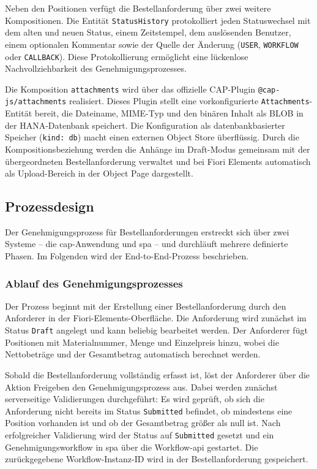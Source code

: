 Neben den Positionen verfügt die Bestellanforderung über zwei weitere Kompositionen. Die Entität \texttt{StatusHistory} protokolliert jeden Statuswechsel mit dem alten und neuen Status, einem Zeitstempel, dem auslösenden Benutzer, einem optionalen Kommentar sowie der Quelle der Änderung (\texttt{USER}, \texttt{WORKFLOW} oder \texttt{CALLBACK}). Diese Protokollierung ermöglicht eine lückenlose Nachvollziehbarkeit des Genehmigungsprozesses.

Die Komposition \texttt{attachments} wird über das offizielle CAP-Plugin \texttt{@cap-js/attachments} realisiert. Dieses Plugin stellt eine vorkonfigurierte \texttt{Attachments}-Entität bereit, die Dateiname, MIME-Typ und den binären Inhalt als BLOB in der HANA-Datenbank speichert. Die Konfiguration als datenbankbasierter Speicher (\texttt{kind: db}) macht einen externen Object Store überflüssig. Durch die Kompositionsbeziehung werden die Anhänge im Draft-Modus gemeinsam mit der übergeordneten Bestellanforderung verwaltet und bei Fiori Elements automatisch als Upload-Bereich in der Object Page dargestellt.

\subsection{Prozessdesign}
\label{subsec:prozessdesign}

Der Genehmigungsprozess für Bestellanforderungen erstreckt sich über zwei Systeme -- die \gls{cap}-Anwendung und \gls{spa} -- und durchläuft mehrere definierte Phasen. Im Folgenden wird der End-to-End-Prozess beschrieben.

\subsubsection{Ablauf des Genehmigungsprozesses}

Der Prozess beginnt mit der Erstellung einer Bestellanforderung durch den Anforderer in der Fiori-Elements-Oberfläche. Die Anforderung wird zunächst im Status \texttt{Draft} angelegt und kann beliebig bearbeitet werden. Der Anforderer fügt Positionen mit Materialnummer, Menge und Einzelpreis hinzu, wobei die Nettobeträge und der Gesamtbetrag automatisch berechnet werden.

Sobald die Bestellanforderung vollständig erfasst ist, löst der Anforderer über die Aktion \glqq Freigeben\grqq{} den Genehmigungsprozess aus. Dabei werden zunächst serverseitige Validierungen durchgeführt: Es wird geprüft, ob sich die Anforderung nicht bereits im Status \texttt{Submitted} befindet, ob mindestens eine Position vorhanden ist und ob der Gesamtbetrag größer als null ist. Nach erfolgreicher Validierung wird der Status auf \texttt{Submitted} gesetzt und ein Genehmigungsworkflow in \gls{spa} über die Workflow-\gls{api} gestartet. Die zurückgegebene Workflow-Instanz-ID wird in der Bestellanforderung gespeichert.

